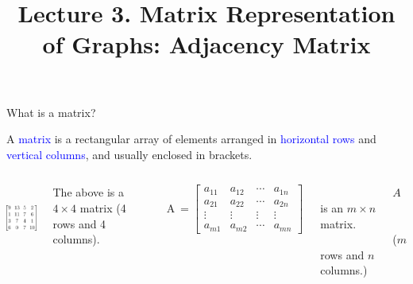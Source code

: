 \documentclass[aspectratio=169]{beamer}
\title{Lecture 3. Matrix Representation of Graphs: Adjacency Matrix}
\date{ }
\providecommand{\Blue}[1]{\textcolor{blue}{#1}}
\begin{document}
\frame[plain]{\titlepage}

\begin{frame}[plain]{What is a matrix?}

A \Blue{matrix} is a rectangular array of elements arranged in \Blue{horizontal rows} 
and \Blue{vertical columns}, and usually enclosed in brackets.
 
   \begin{columns}[c]
  
    \center  
    \includegraphics[height=2.2cm]{./img/lecture3-fig1.png}
    
    \medskip
    
    The above is a $4\times 4$ matrix (4 rows and 4 columns).
   
    
     
     \[ \mathrm{A}\ = \left[ \begin{array}{cccc}
                            a_{11} & a_{12} & \cdots & a_{1n} \\
                            a_{21} & a_{22} & \cdots & a_{2n} \\
                            \vdots &   \vdots     & \vdots & \vdots        \\
                            a_{m1} & a_{m2} & \cdots & a_{mn} 
                           \end{array}
                    \right]                    
   \]   
   \medskip
   
   \ \ \ \ \ \ \ \ \ \ \ \ \   $A$ is an $m\times n$ matrix. \\
   \ \ \ \ \ \ \ \ \ \ \ \ \ ($m$ rows and $n$ columns.)
    
    
  \end{columns}


 \end{frame}
\end{document}
